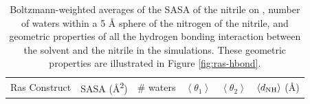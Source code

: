 \begin{table}
    \caption[Nitrile exposure to water in the Ras/\RalBSCN{} constructs]{
        Boltzmann-weighted averages of the SASA of the nitrile on \RalBSCN{}, 
        number of waters within a 5 \si{\angstrom} sphere of the nitrogen of the nitrile, and 
        geometric properties of all the hydrogen bonding interaction between the solvent and the nitrile in the simulations. 
        These geometric properties are illustrated in Figure \ref{fig:ras-hbond}.
    }
    \begin{center}
    \begin{tabular}{cccccc} 
    \toprule
        \rowcolor{lgray}
        Ras Construct & SASA (\si{\angstrom^2})  & \# waters & $\left < \theta_1 \right >$  & $\left < \theta_2 \right >$ & $\left < d_{\rm{NH}} \right >$ (\si{\angstrom}) \\
    
        \cmidrule(r){1-1}\cmidrule(lr){2-2}\cmidrule(lr){3-3}\cmidrule(lr){4-4}\cmidrule(lr){5-5}\cmidrule(l){6-6}
    

\end{tabular}
\end{center}
\end{table}
